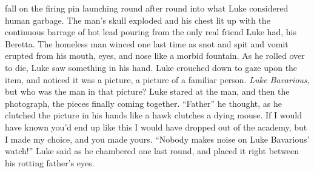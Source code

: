 fall on the firing pin launching round after round into what Luke
considered human garbage. The man's skull exploded and his chest lit up
with the continuous barrage of hot lead pouring from the only real
friend Luke had, his Beretta. The homeless man winced one last time as
snot and spit and vomit erupted from his mouth, eyes, and nose like a
morbid fountain. As he rolled over to die, Luke saw something in his
hand. Luke crouched down to gaze upon the item, and noticed it was a
picture, a picture of a familiar person.  {\em Luke Bavarious}, but who
was the man in that picture? Luke stared at the man, and then the
photograph, the pieces finally coming together. ``Father'' he thought,
as he clutched the picture in his hands like a hawk clutches a dying
mouse. If I would have known you'd end up like this I would have dropped
out of the academy, but I made my choice, and you made yours.  ``Nobody
makes noise on Luke Bavarious' watch!''  Luke said as he chambered one
last round, and placed it right between his rotting father's eyes.

